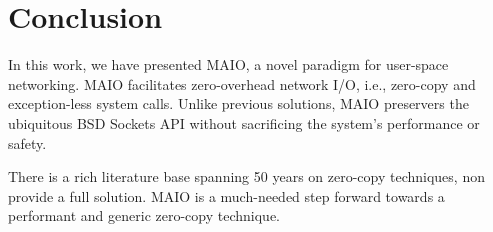 \documentclass[sigconf,9pt]{acmart}
\newcommand{\oursys}{MAIO\xspace}
\newcommand{\sockets}{BSD Sockets\xspace}
\begin{document}

\section{Conclusion}
In this work, we have presented \oursys, a novel paradigm for user-space networking. \oursys facilitates zero-overhead network I/O, i.e., zero-copy and exception-less system calls. Unlike previous solutions, \oursys preservers the ubiquitous \sockets API without sacrificing the system's performance or safety.


There is a rich literature base spanning 50 years on zero-copy techniques, non provide a full solution\cite{song2012performance}. \oursys is a much-needed step forward towards a performant and generic zero-copy technique. %



\end{document}
